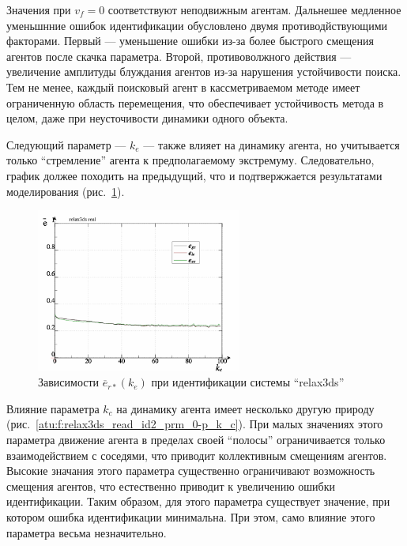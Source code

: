 Значения при $v_f = 0$ соответствуют неподвижным агентам.
Дальнешее медленное уменьшнние ошибок идентификации
обусловлено двумя противодйствующими факторами.
Первый --- уменьшение ошибки из-за более быстрого
смещения агентов после скачка параметра.
Второй, противоволжного действия --- увеличение амплитуды блуждания
агентов из-за нарушения устойчивости поиска. Тем не менее,
каждый поисковый агент в кассметриваемом методе
имеет ограниченную область перемещения,
что обеспечивает устойчивость метода в целом, даже при
неусточивости динамики одного объекта.

Следующий параметр --- $k_e$ --- также влияет на динамику
агента, но учитывается только ``стремление'' агента
к предполагаемому экстремуму. Следовательно,
график должее походить на предыдущий, что и подтвержжается результатами моделирования
(рис.~\ref{atu:f:relax3ds_read_id2_prm_0-p_k_e}).

\begin{figure}[htb!]
  \centerline{\includegraphics[width=0.6\textwidth]{p/relax3ds_read_id2_prm_0-p_k_e.png} }
  \caption{Зависимости $\overline{e}_{r*}(k_e)$ при идентификации системы ``relax3ds''}
  \label{atu:f:relax3ds_read_id2_prm_0-p_k_e}
\end{figure}

Влияние параметра $k_c$ на динамику агента имеет несколько другую природу
(рис.~\ref{atu:f:relax3ds_read_id2_prm_0-p_k_c}).
При малых значениях этого параметра движение агента в пределах
своей ``полосы'' ограничивается только взаимодействием с соседями,
что приводит коллективным смещениям агентов.
Высокие значания этого параметра существенно ограничивают
возможность смещения агентов, что естественно приводит
к увеличению ошибки идентификации. Таким образом,
для этого параметра существует значение,
при котором ошибка идентификации минимальна. При этом,
само влияние этого параметра весьма незначительно.

